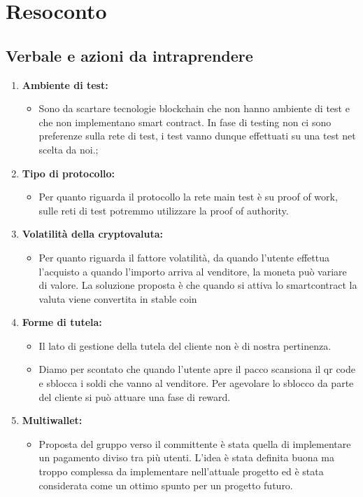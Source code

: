 \section{Resoconto}
\subsection{Verbale e azioni da intraprendere}

\begin{enumerate}
	\item \textbf{Ambiente di test:}
	\begin{itemize}
		\item Sono da scartare tecnologie blockchain che non hanno ambiente di test e che non implementano smart contract.
		In fase di testing non ci sono preferenze sulla rete di test, i test vanno dunque effettuati su una test net scelta da noi.;
	\end{itemize}

	\item \textbf{Tipo di protocollo:}
	\begin{itemize}
		\item Per quanto riguarda il protocollo la rete main test è su proof of work\glo, sulle reti di test potremmo utilizzare la proof of authority\glo.
	\end{itemize}

	\item \textbf{Volatilità della cryptovaluta\glo:}
	\begin{itemize}
		\item Per quanto riguarda il fattore volatilità, da quando l'utente effettua l'acquisto a quando l'importo arriva al venditore, la moneta può variare di valore. La soluzione proposta è che quando si attiva lo smartcontract la valuta viene convertita in stable coin\glo
	\end{itemize}

	\item \textbf{Forme di tutela:}
	\begin{itemize}
		\item Il lato di gestione della tutela del cliente non è di nostra pertinenza.
		\item Diamo per scontato che quando l'utente apre il pacco scansiona il qr code e sblocca i soldi che vanno al venditore. Per agevolare lo sblocco da parte del cliente si può attuare una fase di reward.
	\end{itemize}

	\item \textbf{Multiwallet:}
	\begin{itemize}
		\item Proposta del gruppo verso il committente è stata quella di implementare un pagamento diviso tra più utenti. L'idea è stata definita buona ma troppo complessa da implementare nell'attuale progetto ed è stata considerata come un ottimo spunto per un progetto futuro.
	\end{itemize}


\end{enumerate}
